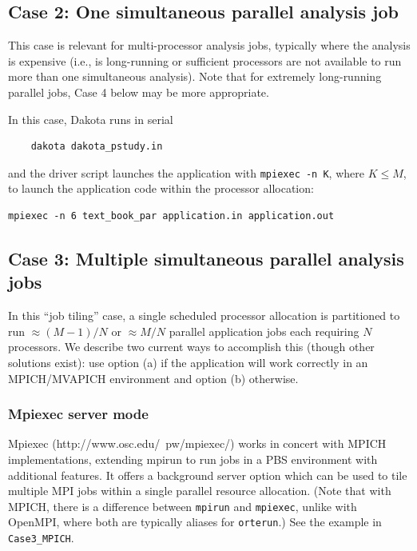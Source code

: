\subsection{Case 2: One simultaneous parallel analysis job}

This case is relevant for multi-processor analysis jobs, typically
where the analysis is expensive (i.e., is long-running or sufficient
processors are not available to run more than one simultaneous
analysis).  Note that for extremely long-running parallel jobs, Case 4
below may be more appropriate.

In this case, Dakota runs in serial
\begin{verbatim}
    dakota dakota_pstudy.in
\end{verbatim}
and the driver script launches the application with {\tt mpiexec -n
K}, where $K \leq M$, to launch the application code within the
processor allocation:
\begin{verbatim}
mpiexec -n 6 text_book_par application.in application.out
\end{verbatim}

\subsection{Case 3: Multiple simultaneous parallel analysis jobs}

In this ``job tiling'' case, a single scheduled processor allocation
is partitioned to run $\approx (M-1)/N$ or $\approx M/N$ parallel
application jobs each requiring $N$ processors.  We describe two 
current ways to accomplish this (though other solutions exist): use 
option (a) if the application will work correctly in an MPICH/MVAPICH 
environment and option (b) otherwise.

\subsubsection{Mpiexec server mode}

Mpiexec (http://www.osc.edu/~pw/mpiexec/) works in concert with MPICH
implementations, extending mpirun to run jobs in a PBS environment
with additional features.  It offers a background server option which
can be used to tile multiple MPI jobs within a single parallel
resource allocation.  (Note that with MPICH, there is a difference
between {\tt mpirun} and {\tt mpiexec}, unlike with OpenMPI, where
both are typically aliases for {\tt orterun}.)  See the example in
\texttt{Case3\_MPICH}.

